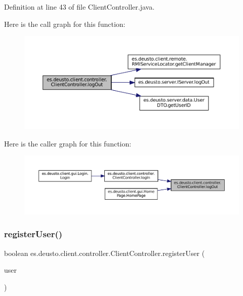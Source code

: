 Definition at line 43 of file Client\+Controller.\+java.

Here is the call graph for this function\+:
\nopagebreak
\begin{figure}[H]
\begin{center}
\leavevmode
\includegraphics[width=350pt]{classes_1_1deusto_1_1client_1_1controller_1_1_client_controller_a9379da9c24d71d3ebafaa44e0f858340_cgraph}
\end{center}
\end{figure}
Here is the caller graph for this function\+:
\nopagebreak
\begin{figure}[H]
\begin{center}
\leavevmode
\includegraphics[width=350pt]{classes_1_1deusto_1_1client_1_1controller_1_1_client_controller_a9379da9c24d71d3ebafaa44e0f858340_icgraph}
\end{center}
\end{figure}
\mbox{\label{classes_1_1deusto_1_1client_1_1controller_1_1_client_controller_a8f77e4957f536e48d7012d643d2c6cb8}} 
\subsubsection{\texorpdfstring{registerUser()}{registerUser()}}
{\footnotesize\ttfamily boolean es.\+deusto.\+client.\+controller.\+Client\+Controller.\+register\+User (\begin{DoxyParamCaption}\item[{\mbox{\hyperlink{classes_1_1deusto_1_1server_1_1data_1_1_user_details_d_t_o}{User\+Details\+D\+TO}}}]{user }\end{DoxyParamCaption})}



